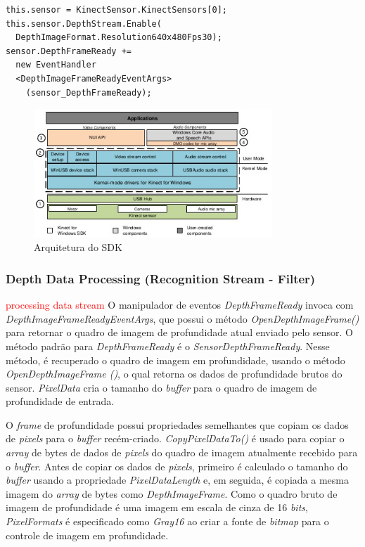 \begin{verbatim}
this.sensor = KinectSensor.KinectSensors[0];
this.sensor.DepthStream.Enable(
  DepthImageFormat.Resolution640x480Fps30);
sensor.DepthFrameReady +=
  new EventHandler
  <DepthImageFrameReadyEventArgs>
    (sensor_DepthFrameReady);
\end{verbatim}


\begin{figure}[ht]
\centering
\includegraphics[width=0.8\textwidth]{images/sdk_architecture_color.png}
\caption{Arquitetura do SDK}
\label{fig:sdk_architecture_color}
\end{figure}


\subsubsection{Depth Data Processing (Recognition Stream - Filter)}\label{sec:depthDataProcessing}
\textcolor{red}{processing data stream}
O manipulador de eventos \textit{DepthFrameReady} invoca com \textit{DepthImageFrameReadyEventArgs}, que possui o método \textit{OpenDepthImageFrame()} para retornar o quadro de imagem de profundidade atual enviado pelo sensor. O  método padrão para \textit{DepthFrameReady} é o \textit{SensorDepthFrameReady}. Nesse método, é recuperado o quadro de imagem em profundidade, usando o método \textit{OpenDepthImageFrame ()}, o qual retorna os dados de profundidade brutos do sensor. \textit{PixelData} cria o tamanho do \textit{buffer} para o quadro de imagem de profundidade de entrada.

O \textit{frame} de profundidade possui propriedades semelhantes que copiam os dados de \textit{pixels} para o \textit{buffer} recém-criado. \textit{CopyPixelDataTo()} é usado para copiar o \textit{array} de bytes de dados de \textit{pixels} do quadro de imagem atualmente recebido para o \textit{buffer}. Antes de copiar os dados de \textit{pixels}, primeiro é calculado o tamanho do \textit{buffer} usando a propriedade \textit{PixelDataLength} e, em seguida, é copiada a mesma imagem do \textit{array} de bytes como \textit{DepthImageFrame}. Como o quadro bruto de imagem de profundidade é uma imagem em escala de cinza de 16 \textit{bits}, \textit{PixelFormats} é especificado  como \textit{Gray16} ao criar a fonte de \textit{bitmap} para o controle de imagem em profundidade.

